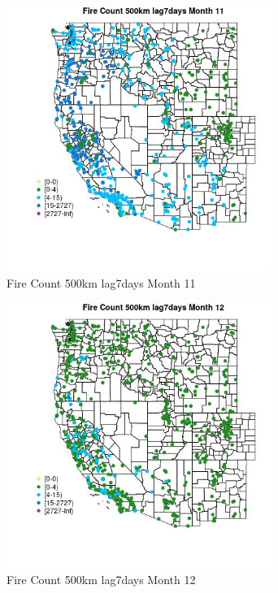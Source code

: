 \begin{figure} 
\centering  
\includegraphics[width=0.77\textwidth]{Code_Outputs/Report_ML_input_PM25_Step4_part_f_de_duplicated_aveswNAs_MapObsMo11Fire_Count_500km_lag7days.jpg} 
\caption{\label{fig:Report_ML_input_PM25_Step4_part_f_de_duplicated_aveswNAsMapObsMo11Fire_Count_500km_lag7days}Fire Count 500km lag7days Month 11} 
\end{figure} 
 

\begin{figure} 
\centering  
\includegraphics[width=0.77\textwidth]{Code_Outputs/Report_ML_input_PM25_Step4_part_f_de_duplicated_aveswNAs_MapObsMo12Fire_Count_500km_lag7days.jpg} 
\caption{\label{fig:Report_ML_input_PM25_Step4_part_f_de_duplicated_aveswNAsMapObsMo12Fire_Count_500km_lag7days}Fire Count 500km lag7days Month 12} 
\end{figure} 
 

